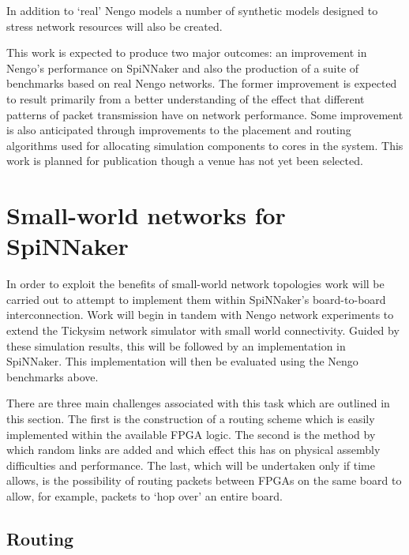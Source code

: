 		In addition to `real' Nengo models a number of synthetic models designed to
		stress network resources will also be created.
		
		This work is expected to produce two major outcomes: an improvement in
		Nengo's performance on SpiNNaker and also the production of a suite of
		benchmarks based on real Nengo networks. The former improvement is expected
		to result primarily from a better understanding of the effect that different
		patterns of packet transmission have on network performance. Some
		improvement is also anticipated through improvements to the placement and
		routing algorithms used for allocating simulation components to cores in the
		system. This work is planned for publication though a venue has not yet been
		selected.
		
	
	\section{Small-world networks for SpiNNaker}
		
		
		In order to exploit the benefits of small-world network topologies work will
		be carried out to attempt to implement them within SpiNNaker's
		board-to-board interconnection. Work will begin in tandem with Nengo network
		experiments to extend the Tickysim network simulator with small world
		connectivity. Guided by these simulation results, this will be followed by
		an implementation in SpiNNaker. This implementation will then be evaluated
		using the Nengo benchmarks above.
		
		There are three main challenges associated with this task which are outlined
		in this section. The first is the construction of a routing scheme which is
		easily implemented within the available FPGA logic. The second is the method
		by which random links are added and which effect this has on physical
		assembly difficulties and performance. The last, which will be undertaken
		only if time allows, is the possibility of routing packets between FPGAs on
		the same board to allow, for example, packets to `hop over' an entire board.
		
		\subsection{Routing}
			

